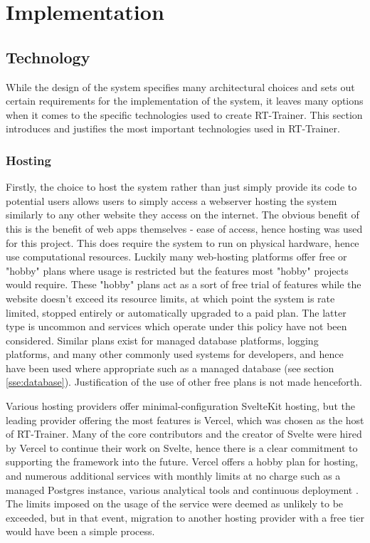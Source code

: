 \chapter{Implementation}
\label{ch:implementation}

\section{Technology}
\label{se:tech}
While the design of the system specifies many architectural choices and sets out certain requirements for the implementation of the system, it leaves many options when it comes to the specific technologies used to create RT-Trainer. This section introduces and justifies the most important technologies used in RT-Trainer.

\subsection{Hosting}
\label{sse:hosting}
Firstly, the choice to host the system rather than just simply provide its code to potential users allows users to simply access a webserver hosting the system similarly to any other website they access on the internet. The obvious benefit of this is the benefit of web apps themselves - ease of access, hence hosting was used for this project. This does require the system to run on physical hardware, hence use computational resources. Luckily many web-hosting platforms offer free or "hobby" plans where usage is restricted but the features most "hobby" projects would require. These "hobby" plans act as a sort of free trial of features while the website doesn't exceed its resource limits, at which point the system is rate limited, stopped entirely or automatically upgraded to a paid plan. The latter type is uncommon and services which operate under this policy have not been considered. Similar plans exist for managed database platforms, logging platforms, and many other commonly used systems for developers, and hence have been used where appropriate such as a managed database (see section \ref{sse:database}). Justification of the use of other free plans is not made henceforth.

Various hosting providers offer minimal-configuration SvelteKit hosting, but the leading provider offering the most features is Vercel, which was chosen as the host of RT-Trainer. Many of the core contributors and the creator of Svelte were hired by Vercel to continue their work on Svelte, hence there is a clear commitment to supporting the framework into the future. Vercel offers a hobby plan for hosting, and numerous additional services with monthly limits at no charge such as a managed Postgres instance, various analytical tools and continuous deployment \cite{vercel-hobby-plan}. The limits imposed on the usage of the service were deemed as unlikely to be exceeded, but in that event, migration to another hosting provider with a free tier would have been a simple process.

